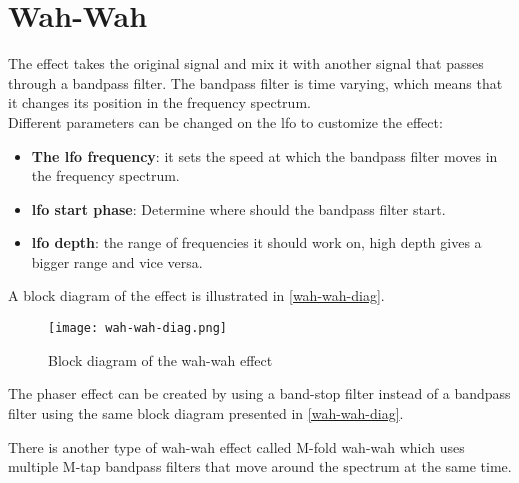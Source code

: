 \section{Wah-Wah}

The effect takes the original signal and mix it with another signal that passes through a bandpass filter. The bandpass filter is time varying, which means that it changes its position in the frequency spectrum. \\
Different parameters can be changed on the \gls{lfo} to customize the effect:\\

\begin{itemize}
	\item \textbf{The \gls{lfo} frequency}: it sets the speed at which the bandpass filter moves in the frequency spectrum.
	\item \textbf{\gls{lfo} start phase}: Determine where should the bandpass filter start.
	\item \textbf{\gls{lfo} depth}: the range of frequencies it should work on, high depth gives a bigger range and vice versa.
\end{itemize}

A block diagram of the effect is illustrated in \autoref{wah-wah-diag}.  

\begin{figure} [htbp]
	\centering
	\texttt{[image: wah-wah-diag.png]}
	\caption{Block diagram of the wah-wah effect}
	\label{wah-wah-diag}
\end{figure}

The phaser effect can be created by using a band-stop filter instead of a bandpass filter using the same block diagram presented in \autoref{wah-wah-diag}.

There is another type of wah-wah effect called M-fold wah-wah which uses multiple M-tap bandpass filters that move around the spectrum at the same time.
